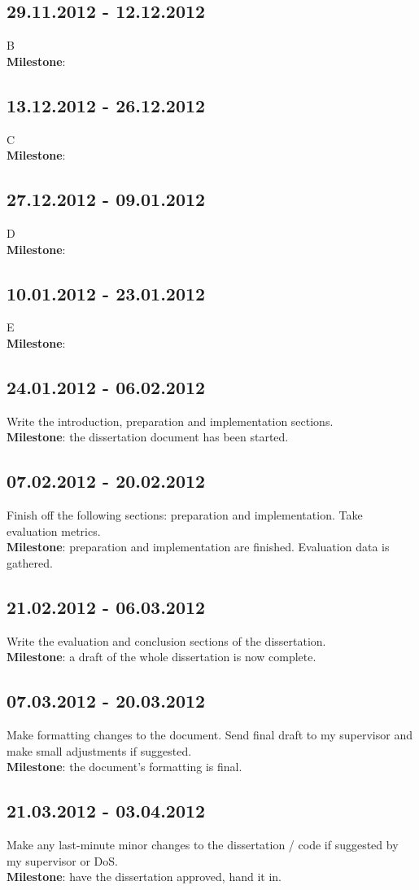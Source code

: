 \documentclass[12pt,a4paper]{article} \usepackage{a4wide}
\begin{document}
\subsection*{29.11.2012 - 12.12.2012}
B
\\{\bf Milestone}:

\subsection*{13.12.2012 - 26.12.2012}
C
\\{\bf Milestone}:

\subsection*{27.12.2012 - 09.01.2012}
D
\\{\bf Milestone}:

\subsection*{10.01.2012 - 23.01.2012}
E
\\{\bf Milestone}:

\subsection*{24.01.2012 - 06.02.2012}
Write the introduction, preparation and implementation sections.
\\{\bf Milestone}: the dissertation document has been started.

\subsection*{07.02.2012 - 20.02.2012}
Finish off the following sections: preparation and implementation.
Take evaluation metrics.
\\{\bf Milestone}: preparation and implementation are finished. Evaluation data is gathered.

\subsection*{21.02.2012 - 06.03.2012}
Write the evaluation and conclusion sections of the dissertation.
\\{\bf Milestone}: a draft of the whole dissertation is now complete.

\subsection*{07.03.2012 - 20.03.2012}
Make formatting changes to the document. Send final draft to my supervisor and make small adjustments if suggested.
\\{\bf Milestone}: the document’s formatting is final.
\subsection*{21.03.2012 - 03.04.2012}
Make any last-minute minor changes to the dissertation / code if suggested by my supervisor or DoS.
\\{\bf Milestone}: have the dissertation approved, hand it in.


\end{document}
